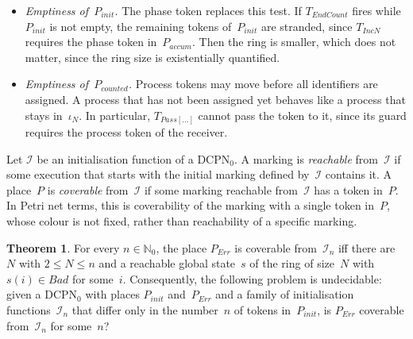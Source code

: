 \documentclass[11pt]{article}
\theoremstyle{definition}
\newcommand{\NatZero}{\mathbb{N}_0}
\newcommand{\DCPN}[1]{\texorpdfstring{\textup{DCPN}\ensuremath{_{#1}}}{DCPN#1}}
\newtheorem{theorem}{Theorem}
\begin{document}
\begin{itemize}
  \item \emph{Emptiness of~$P_{\mathit{init}}$.} The phase token replaces
    this test. If $T_{\mathit{EndCount}}$ fires while $P_{\mathit{init}}$ is
    not empty, the remaining tokens of~$P_{\mathit{init}}$ are stranded,
    since $T_{\mathit{IncN}}$ requires the phase token
    in~$P_{\mathit{accum}}$. Then the ring is smaller, which does not matter,
    since the ring size is existentially quantified.
  \item \emph{Emptiness of~$P_{\mathit{counted}}$.} Process tokens may move before all
    identifiers are assigned. A process that has not been assigned yet
    behaves like a process that stays in~$\iota_N$. In particular,
    $T_{\mathit{Pass}[\dots]}$ cannot pass the token to it, since its guard
    requires the process token of the receiver.
\end{itemize}

Let $\mathcal{I}$ be an initialisation function of a \DCPN{0}. A marking
is \emph{reachable} from~$\mathcal{I}$ if some execution that starts with the
initial marking defined by~$\mathcal{I}$ contains it. A place~$P$ is
\emph{coverable} from~$\mathcal{I}$ if some marking reachable
from~$\mathcal{I}$ has a token in~$P$. In Petri net terms, this is
coverability of the marking with a single token in~$P$, whose colour is not
fixed, rather than reachability of a specific marking.

\begin{theorem}\label{thm:undecidable}
  For every $n \in \NatZero$, the place $P_{\mathit{Err}}$ is coverable
  from~$\mathcal{I}_n$ iff there are $N$ with $2 \le N \le n$ and a
  reachable global state~$s$ of the ring of size~$N$ with
  $s(i) \in \mathit{Bad}$ for some~$i$. Consequently, the following problem
  is undecidable: given a \DCPN{0} with places $P_{\mathit{init}}$
  and~$P_{\mathit{Err}}$ and a family of initialisation
  functions~$\mathcal{I}_n$ that differ only in the number~$n$ of tokens
  in~$P_{\mathit{init}}$, is $P_{\mathit{Err}}$ coverable
  from~$\mathcal{I}_n$ for some~$n$?
\end{theorem}
\end{document}
